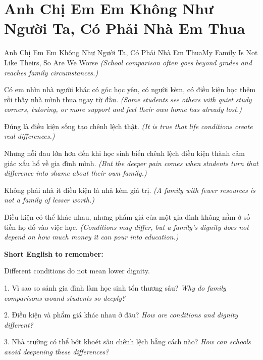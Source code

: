 \section{Anh Chị Em Em Không Như Người Ta, Có Phải Nhà Em Thua}
\begin{truyen}{Anh Chị Em Em Không Như Người Ta, Có Phải Nhà Em Thua}{My Family Is Not Like Theirs, So Are We Worse}
\textit{(School comparison often goes beyond grades and reaches family circumstances.)}

Có em nhìn nhà người khác có góc học yên, có người kèm, có điều kiện học thêm rồi thấy nhà mình thua ngay từ đầu.
\textit{(Some students see others with quiet study corners, tutoring, or more support and feel their own home has already lost.)}

Đúng là điều kiện sống tạo chênh lệch thật.
\textit{(It is true that life conditions create real differences.)}

Nhưng nỗi đau lớn hơn đến khi học sinh biến chênh lệch điều kiện thành cảm giác xấu hổ về gia đình mình.
\textit{(But the deeper pain comes when students turn that difference into shame about their own family.)}

Không phải nhà ít điều kiện là nhà kém giá trị.
\textit{(A family with fewer resources is not a family of lesser worth.)}
\end{truyen}

\begin{baihoc}
Điều kiện có thể khác nhau, nhưng phẩm giá của một gia đình không nằm ở số tiền họ đổ vào việc học.
\textit{(Conditions may differ, but a family's dignity does not depend on how much money it can pour into education.)}
\end{baihoc}

\begin{ghinhoanh}
\textbf{Short English to remember:}

Different conditions do not mean lower dignity.

\end{ghinhoanh}

\begin{tuhocnhanh}
1. Vì sao so sánh gia đình làm học sinh tổn thương sâu? \textit{Why do family comparisons wound students so deeply?}

2. Điều kiện và phẩm giá khác nhau ở đâu? \textit{How are conditions and dignity different?}

3. Nhà trường có thể bớt khoét sâu chênh lệch bằng cách nào? \textit{How can schools avoid deepening these differences?}
\end{tuhocnhanh}
\ngancach

